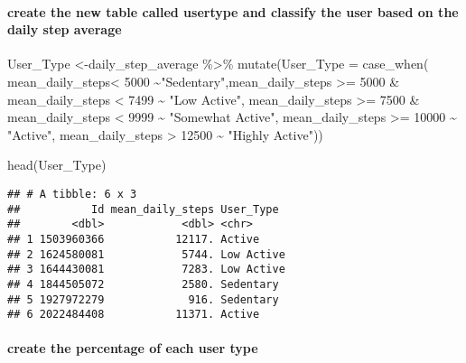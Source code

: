 \documentclass[
]{article}
\newenvironment{Shaded}{\begin{snugshade}}{\end{snugshade}}
\newcommand{\AttributeTok}[1]{\textcolor[rgb]{0.77,0.63,0.00}{#1}}
\newcommand{\DecValTok}[1]{\textcolor[rgb]{0.00,0.00,0.81}{#1}}
\newcommand{\FunctionTok}[1]{\textcolor[rgb]{0.00,0.00,0.00}{#1}}
\newcommand{\NormalTok}[1]{#1}
\newcommand{\OtherTok}[1]{\textcolor[rgb]{0.56,0.35,0.01}{#1}}
\newcommand{\SpecialCharTok}[1]{\textcolor[rgb]{0.00,0.00,0.00}{#1}}
\newcommand{\StringTok}[1]{\textcolor[rgb]{0.31,0.60,0.02}{#1}}
\begin{document}
\hypertarget{create-the-new-table-called-usertype-and-classify-the-user-based-on-the-daily-step-average}{%
\paragraph{create the new table called usertype and classify the user
based on the daily step
average}\label{create-the-new-table-called-usertype-and-classify-the-user-based-on-the-daily-step-average}}

\begin{Shaded}
\begin{Highlighting}[]
\NormalTok{User\_Type  }\OtherTok{\textless{}{-}}\NormalTok{daily\_step\_average }\SpecialCharTok{\%\textgreater{}\%}
  \FunctionTok{mutate}\NormalTok{(}\AttributeTok{User\_Type =} \FunctionTok{case\_when}\NormalTok{(}
\NormalTok{    mean\_daily\_steps}\SpecialCharTok{\textless{}} \DecValTok{5000} \SpecialCharTok{\textasciitilde{}}\StringTok{"Sedentary"}\NormalTok{,mean\_daily\_steps }\SpecialCharTok{\textgreater{}=} \DecValTok{5000} \SpecialCharTok{\&}\NormalTok{ mean\_daily\_steps }\SpecialCharTok{\textless{}} \DecValTok{7499} \SpecialCharTok{\textasciitilde{}} \StringTok{"Low Active"}\NormalTok{,}
\NormalTok{    mean\_daily\_steps }\SpecialCharTok{\textgreater{}=} \DecValTok{7500} \SpecialCharTok{\&}\NormalTok{ mean\_daily\_steps }\SpecialCharTok{\textless{}} \DecValTok{9999} \SpecialCharTok{\textasciitilde{}} \StringTok{"Somewhat Active"}\NormalTok{,  mean\_daily\_steps }\SpecialCharTok{\textgreater{}=} \DecValTok{10000} \SpecialCharTok{\textasciitilde{}} \StringTok{"Active"}\NormalTok{,}
\NormalTok{    mean\_daily\_steps }\SpecialCharTok{\textgreater{}} \DecValTok{12500} \SpecialCharTok{\textasciitilde{}} \StringTok{"Highly Active"}\NormalTok{))}

\FunctionTok{head}\NormalTok{(User\_Type)}
\end{Highlighting}
\end{Shaded}

\begin{verbatim}
## # A tibble: 6 x 3
##           Id mean_daily_steps User_Type 
##        <dbl>            <dbl> <chr>     
## 1 1503960366           12117. Active    
## 2 1624580081            5744. Low Active
## 3 1644430081            7283. Low Active
## 4 1844505072            2580. Sedentary 
## 5 1927972279             916. Sedentary 
## 6 2022484408           11371. Active
\end{verbatim}

\hypertarget{create-the-percentage-of-each-user-type}{%
\paragraph{create the percentage of each user
type}\label{create-the-percentage-of-each-user-type}}
\end{document}
